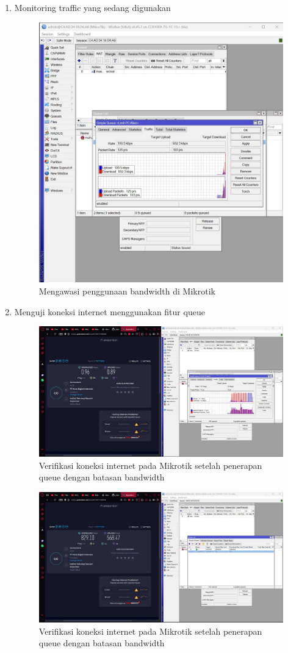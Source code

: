 \begin{enumerate}
    \item Monitoring traffic yang sedang digunakan
    \begin{figure}[H]
        \centering
        \includegraphics[width=0.5\linewidth]{P1/img/gambar12.jpeg}
        \caption{Mengawasi penggunaan bandwidth di Mikrotik}
        \label{fig:Monitoring-trafik-mikrotik}
    \end{figure}

    \item Menguji koneksi internet menggunakan fitur queue
    \begin{figure}[H]
        \centering
        \includegraphics[width=0.5\linewidth]{P1/img/gambar13.jpeg}
        \caption{Verifikasi koneksi internet pada Mikrotik setelah penerapan queue dengan batasan bandwidth}
        \label{fig:Pengujian-koneksi-internet-mikrotik}
    \end{figure}

    \begin{figure}[H]
        \centering
        \includegraphics[width=0.5\linewidth]{P1/img/gambar14.jpeg}
        \caption{Verifikasi koneksi internet pada Mikrotik setelah penerapan queue dengan batasan bandwidth}
        \label{fig:Pengujian-koneksi-internet-mikrotik-2}
    \end{figure}

\end{enumerate}


